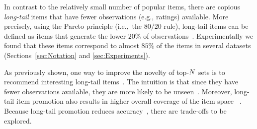 In contrast to the relatively small number of popular items, there are copious  {\it long-tail\/} items that have fewer observations (e.g., ratings) available. More precisely,  using the Pareto  principle (i.e.,~the $80/20$ rule),  long-tail items can be defined as items that generate the lower $20\%$ of observations~\cite{yin2012challenging}. Experimentally we found that these items correspond to almost $85\%$ of the items in several datasets (Sections~\ref{sec:Notation} and \ref{sec:Experiments}). %


As previously shown, one way to improve the novelty of top-$N$ sets is to recommend interesting long-tail items~\cite{cremonesi2010performance,ge2010beyond}.  The intuition  is that since they have fewer observations available,  they are more likely to be unseen~\cite{Kaminskas:2016:DSN:3028254.2926720}.  
Moreover, long-tail item promotion also results in higher overall coverage of the item space%
~\cite{vargas2014improving,Castells2015,zhang2008avoiding,zhang2012auralist,adomavicius2011maximizing,anderson2006thelongtail,yin2012challenging,jambor2010optimizing}. Because long-tail promotion reduces accuracy~\cite{steck2011item}, there are trade-offs to be explored.



